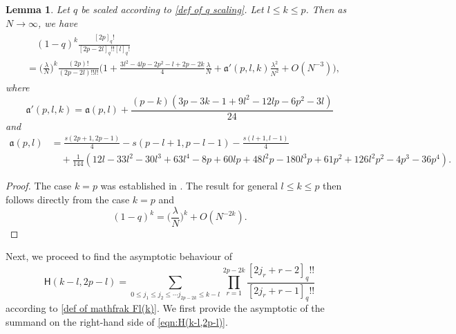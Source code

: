 \documentclass{amsart}
\theoremstyle{plain}
\newtheorem{lem}[thm]{Lemma}
\theoremstyle{remark}
\numberwithin{equation}{section}
\begin{document}
\begin{lem}\label{lem:mfrakF1}
Let $q$ be scaled according to \eqref{def of q scaling}. Let $l \le k \le p$. Then as $N\rightarrow\infty$, we have
\begin{align}
\begin{split}
&\quad (1-q)^{k}\frac{[2p]_{q}!}{[2p-2l]_{q}!![l]_{q}!}
\\
&=\Big(\frac{\lambda}{N}\Big)^{k}
    \frac{(2p)!}{(2p-2l)!!l!}
    \Big(1+\frac{3l^2-4lp-2p^2-l+2p-2k}{4}\frac{\lambda}{N}
    +\mathfrak{a}'(p,l,k)\frac{\lambda^2}{N^2}
    +O(N^{-3})\Big), 
\end{split}
\end{align}
where 
\begin{equation*}
    \mathfrak{a}'(p,l,k)=\mathfrak{a}(p,l)+\frac{(p-k)(3p-3k-1+9l^2-12lp-6p^2-3l)}{24}
\end{equation*}
and 
\begin{align*}
    \mathfrak{a}(p,l) &=\frac{s(2p+1,2p-1)}{4}-s(p-l+1,p-l-1)-\frac{s(l+1,l-1)}{4}
    \\
    &\quad +\frac{1}{144}(12l-33l^2-30l^3+63l^4-8p+60lp+48l^2p-180l^3p+61p^2+126l^2p^2-4p^3-36p^4).
\end{align*} 
\end{lem}
\begin{proof}
The case $k = p$ was established in \cite[Lemma 4.1]{BFO24}. The result for general $l \le k \le p$ then follows directly from the case $k=p$ and  
\begin{equation*}
    (1-q)^{k}=\Big(\frac{\lambda}{N}\Big)^{k}+O(N^{-2k}). 
\end{equation*}
\end{proof}

Next, we proceed to find the asymptotic behaviour of
\begin{equation}\label{eqn:H(k-l,2p-l)}
    \mathsf{H}(k-l,2p-l)=\sum_{0\leq j_1\leq j_2\leq\cdots j_{2p-2k}\leq k-l}\prod_{r=1}^{2p-2k}\frac{[2j_{r}+r-2]_{q}!!}{[2j_{r}+r-1]_{q}!!}
\end{equation}
according to \eqref{def of mathfrak Fl(k)}. We first provide the asymptotic of the summand on the right-hand side of \eqref{eqn:H(k-l,2p-l)}.
\end{document}
